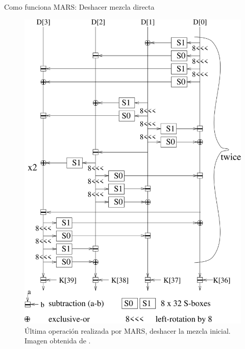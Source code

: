 \documentclass{beamer}
\begin{document}
\begin{frame}{Como funciona MARS: Deshacer mezcla directa}
	\begin{figure}[H]
		\centering
		\includegraphics[scale = 0.38]{deshacer_mezcla.png}
		\caption{Última operación realizada por MARS, deshacer la mezcla inicial. Imagen obtenida de \cite{ampliacionPropuestaMARS}.} \label{fig:undo_mezcla_directa}
	\end{figure}
\end{frame}
\end{document}
